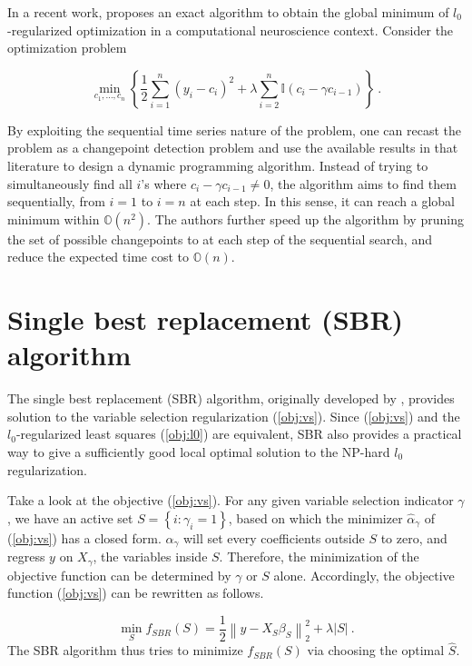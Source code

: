 \documentclass[11pt]{article}%
\numberwithin{equation}{section}
\theoremstyle{plain}
\begin{document}
In a recent work, \cite{jewell2017} proposes an exact algorithm to obtain the global minimum of $l_0$-regularized optimization in a computational neuroscience context. Consider the optimization problem

$$
\min\limits_{c_1,\ldots,c_n}\left\{\frac12\sum\limits_{i = 1}^n\left(y_i - c_i\right)^2 + \lambda\sum\limits_{i = 2}^{n}\mathbb{I}{\left(c_i - \gamma c_{i-1}\right)}\right\} \ .
$$

By exploiting the sequential time series nature of the problem, one can recast the problem as a changepoint detection problem and use the available results in that literature to design a dynamic programming algorithm. Instead of trying to simultaneously find all $i$'s where $c_i - \gamma c_{i - 1} \neq 0$, the algorithm aims to find them sequentially, from $i = 1$ to $i = n$ at each step. In this sense, it can reach a global minimum within $\mathbb{O}\left(n^2\right)$. The authors further speed up the algorithm by pruning the set of possible changepoints to at each step of the sequential search, and reduce the expected time cost to $\mathbb{O}\left(n\right)$.

\section{Single best replacement (SBR) algorithm \label{sbr}}

The single best replacement (SBR) algorithm, originally developed by \cite{soussen2011}, provides solution to the variable selection regularization (\ref{obj:vs}).  Since (\ref{obj:vs}) and the $l_0$-regularized least squares (\ref{obj:l0}) are equivalent, SBR also provides a practical way to give a sufficiently good local optimal solution to the NP-hard $l_0$ regularization.

Take a look at the objective (\ref{obj:vs}).  For any given variable selection indicator $\gamma$, we have an active set $S = \left\{i: \gamma_i = 1\right\}$, based on which the minimizer $\hat\alpha_\gamma$ of (\ref{obj:vs}) has a closed form.  $\hat\alpha_\gamma$ will set every coefficients outside $S$ to zero, and regress $y$ on $X_\gamma$, the variables inside $S$.  Therefore, the minimization of the objective function can be determined by $\gamma$ or $S$ alone.  Accordingly, the objective function (\ref{obj:vs}) can be rewritten as follows.

\begin{equation}
\label{obj:sbr}
\min\limits_{S}
f_{SBR}(S) = 
\frac12 \left\|y - X_S \beta_S \right\|_2^2
+ \lambda
\left|S\right| \ .
\end{equation}
The SBR algorithm thus tries to minimize $f_{SBR}(S)$ via choosing the optimal $\hat S$.
\end{document}
